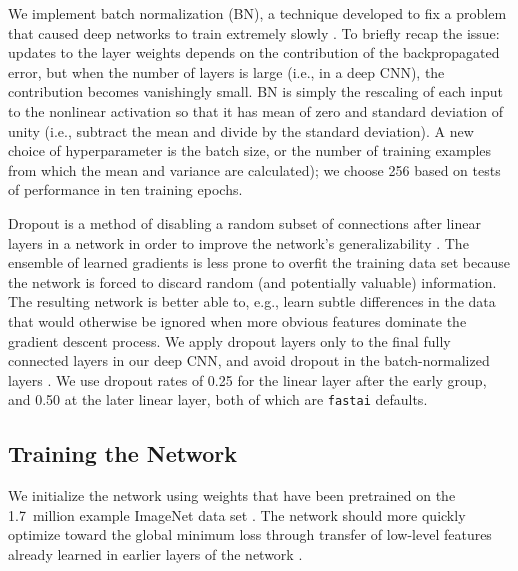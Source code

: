 \documentclass[fleqn,usenatbib]{mnras}
\begin{document}

We implement batch normalization (BN), a technique developed to fix a problem that caused deep networks to train extremely slowly \citep{batchnorm}.
To briefly recap the issue: updates to the layer weights depends on the contribution of the backpropagated error, but when the number of layers is large (i.e., in a deep CNN), the contribution becomes vanishingly small.
BN is simply the rescaling of each input to the nonlinear activation so that it has mean of zero and standard deviation of unity (i.e., subtract the mean and divide by the standard deviation).
A new choice of hyperparameter is the batch size, or the number of training examples from which the mean and variance are calculated); we choose 256 based on tests of performance in ten training epochs.

Dropout is a method of disabling a random subset of connections after linear layers in a network in order to improve the network's generalizability \citep{dropout}.
The ensemble of learned gradients is less prone to overfit the training data set because the network is forced to discard random (and potentially valuable) information.
The resulting network is better able to, e.g., learn subtle differences in the data that would otherwise be ignored when more obvious features dominate the gradient descent process.
We apply dropout layers only to the final fully connected layers in our deep CNN, and avoid dropout in the batch-normalized layers \citep[as recommended by][]{batchnorm}.
We use dropout rates of 0.25 for the linear layer after the early group, and 0.50 at the later linear layer, both of which are \texttt{fastai} defaults.



\subsection{Training the Network}
We initialize the network using weights that have been pretrained on the 1.7~million example ImageNet data set \citep[which contains 1000 classes of objects;][]{ImageNet}.
The network should more quickly optimize toward the global minimum loss through transfer of low-level features already learned in earlier layers of the network \citep[known as transfer learning; see, e.g.,][]{Pan2010}.
\end{document}
